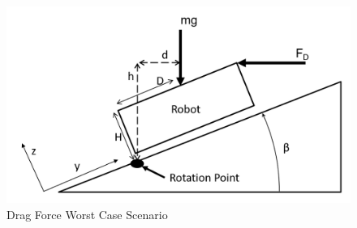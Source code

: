 \begin{figure}
    \centering
    \includegraphics[width=\textwidth]{img/DragForce.png}
    \caption{Drag Force Worst Case Scenario}
    \label{fig:drag_worst_case}
\end{figure}